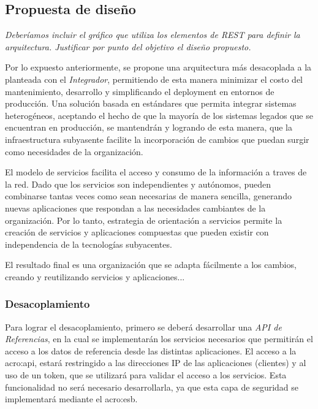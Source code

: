 \subsection{Propuesta de diseño}
\label{propuesta}

\textit{Deberíamos incluir el gráfico que utiliza los elementos de REST para definir la arquitectura. Justificar por punto del objetivo el diseño propuesto.}\\



Por lo expuesto anteriormente, se propone una arquitectura más desacoplada a la planteada con el \textit{Integrador}, permitiendo de esta manera minimizar el costo del mantenimiento, desarrollo y simplificando el deployment en entornos de producción.  Una solución basada en estándares que permita integrar sistemas heterogéneos, aceptando el hecho de que la mayoría de los sistemas legados que se encuentran en producción, se mantendrán y logrando de esta manera, que la infraestructura subyasente facilite la incorporación de cambios que puedan surgir como necesidades de la organización.

El modelo de servicios facilita el acceso y consumo de la información a traves de la red.  Dado que los servicios son independientes y autónomos, pueden combinarse tantas veces como sean necesarias de manera sencilla, generando nuevas aplicaciones que respondan a las necesidades cambiantes de la organización.  Por lo tanto, estrategia de orientación a servicios permite la creación de servicios y aplicaciones compuestas que pueden existir con independencia de la tecnologías subyacentes\cite{microsoft2006}.

El resultado final es una organización que se adapta fácilmente a los cambios, creando y reutilizando servicios y aplicaciones...

\subsubsection{Desacoplamiento}

Para lograr el desacoplamiento, primero se deberá desarrollar una \textit{API de Referencias}, en la cual se implementarán los servicios necesarios que permitirán el acceso a los datos de referencia desde las distintas aplicaciones.  El acceso a la \gls{acro:api}, estará restringido a las direcciones IP de las aplicaciones (clientes) y al uso de un token, que se utilizará para validar el acceso a los servicios.  Esta funcionalidad no será necesario desarrollarla, ya que esta capa de seguridad se implementará mediante el \gls{acro:esb}.

